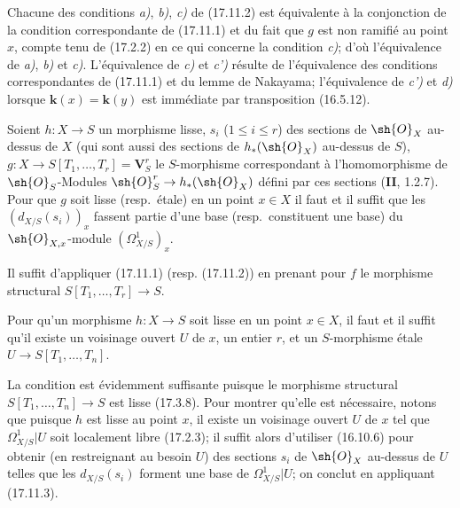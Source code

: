 Chacune des conditions \emph{a)}, \emph{b)}, \emph{c)} de (17.11.2) est équivalente à la conjonction de la condition correspondante de (17.11.1) et du fait que $g$ est non ramifié au point $x$, compte tenu de (17.2.2) en ce qui concerne la condition \emph{c)}; d'où l'équivalence de \emph{a)}, \emph{b)} et \emph{c)}. L'équivalence de \emph{c)} et \emph{c')} résulte de l'équivalence des conditions correspondantes de (17.11.1) et du lemme de Nakayama; l'équivalence de \emph{c')} et \emph{d)} lorsque $\boldsymbol{k}(x)=\boldsymbol{k}(y)$ est immédiate par transposition (16.5.12).

\begin{corollary}[17.11.3]
\label{IV.17.11.3}
Soient $h:X\to S$ un morphisme lisse, $s_i$ \textup{($1\leq i\leq r$)} des sections de $\sh{O}_X$ au-dessus de $X$ \textup{(}qui sont aussi des sections de $h_*(\sh{O}_X)$ au-dessus de $S$\textup{)}, $g:X\to S[T_1,\ldots,T_r]=\mathbf{V}_S^r$ le $S$-morphisme correspondant à l'homomorphisme de $\sh{O}_S$-Modules $\sh{O}_S^r\to h_*(\sh{O}_X)$ défini par ces sections \textup{(\textbf{II}, 1.2.7)}. Pour que $g$ soit lisse \textup{(resp.}\ étale\textup{)} en un point $x\in X$ il faut et il suffit que les $(d_{X/S}(s_i))_x$ fassent partie d'une base \textup{(resp.}\ constituent une base\textup{)} du $\sh{O}_{X,x}$-module $(\varOmega^1_{X/S})_x$.
\end{corollary}

Il suffit d'appliquer (17.11.1) (resp. (17.11.2)) en prenant pour $f$ le morphisme structural $S[T_1,\ldots,T_r]\to S$.

\begin{corollary}[17.11.4]
\label{IV.17.11.4}
Pour qu'un morphisme $h:X\to S$ soit lisse en un point $x\in X$, il faut et il suffit qu'il existe un voisinage ouvert $U$ de $x$, un entier $r$, et un $S$-morphisme étale $U\to S[T_1,\ldots,T_n]$.
\end{corollary}


La condition est évidemment suffisante puisque le morphisme structural $S[T_1,\ldots,T_n]\to S$ est lisse (17.3.8). Pour montrer qu'elle est nécessaire, notons que puisque $h$ est lisse au point $x$, il existe un voisinage ouvert $U$ de $x$ tel que $\varOmega^1_{X/S}|U$ soit localement libre (17.2.3); il suffit alors d'utiliser (16.10.6) pour obtenir (en restreignant au besoin $U$) des sections $s_i$ de $\sh{O}_X$ au-dessus de $U$ telles que les $d_{X/S}(s_i)$ forment une base de $\varOmega^1_{X/S}|U$; on conclut en appliquant (17.11.3).


